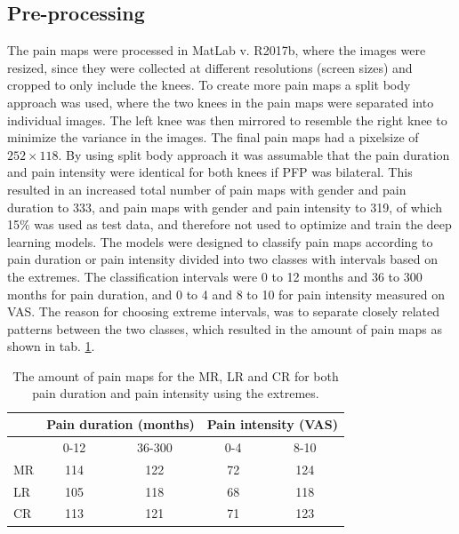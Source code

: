 \subsection{Pre-processing}
The pain maps were processed in MatLab v. R2017b, where the images were resized, since they were collected at different resolutions (screen sizes) and cropped to only include the knees. To create more pain maps a split body approach was used, where the two knees in the pain maps were separated into individual images. The left knee was then mirrored to resemble the right knee to minimize the variance in the images. The final pain maps had a pixelsize of $252 \times 118$.
By using split body approach it was assumable that the pain duration and pain intensity were identical for both knees if PFP was bilateral. This resulted in an increased total number of pain maps with gender and pain duration to 333, and pain maps with gender and pain intensity to 319, of which 15\% was used as test data, and therefore not used to optimize and train the deep learning models. \newline
\noindent
The models were designed to classify pain maps according to pain duration or pain intensity divided into two classes with intervals based on the extremes. The classification intervals were 0 to 12 months and 36 to 300 months for pain duration, and 0 to 4 and 8 to 10 for pain intensity measured on VAS. The reason for choosing extreme intervals, was to separate closely related patterns between the two classes, which resulted in the amount of pain maps as shown in tab. \ref{tab:painmaps}.

\begin{table}[H]
\centering
\begin{tabular}{@{}lcccc@{}}
\toprule
   & \multicolumn{2}{c}{Pain duration (months)} & \multicolumn{2}{c}{Pain intensity (VAS)} \\ \midrule
   & 0-12                & 36-300               & 0-4                & 8-10                \\ \midrule
MR & 114                 & 122                  & 72                 & 124                 \\
LR & 105                 & 118                  & 68                 & 118                 \\
CR & 113                 & 121                  & 71                 & 123                 \\ \bottomrule
\end{tabular}
\caption{The amount of pain maps for the MR, LR and CR for both pain duration and pain intensity using the extremes.}
\label{tab:painmaps}
\end{table}

